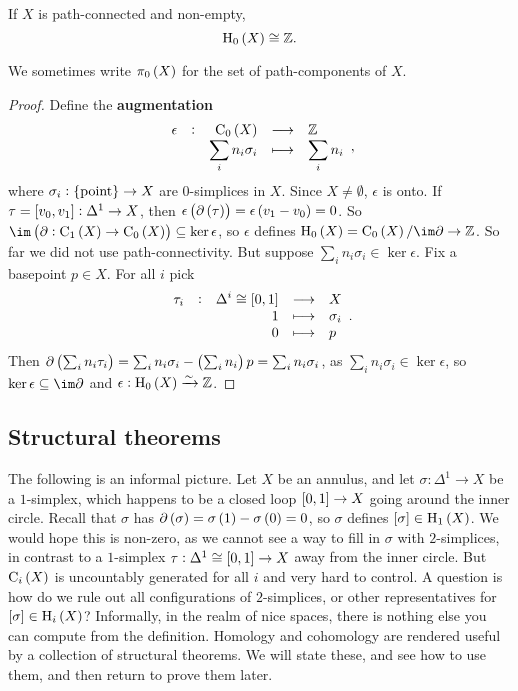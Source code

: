 \begin{lemma}
If $ X $ is path-connected and non-empty,
$$ \H_0\br{X} \cong \ZZ. $$
\end{lemma}

We sometimes write $ \pi_0\br{X} $ for the set of path-components of $ X $.

\begin{proof}
Define the \textbf{augmentation}
$$ \function[\epsilon]{\C_0\br{X}}{\ZZ}{\sum_i n_i\sigma_i}{\sum_i n_i}, $$
where $ \sigma_i : \pt \to X $ are $ 0 $-simplices in $ X $. Since $ X \ne \emptyset $, $ \epsilon $ is onto. If $ \tau = \sbr{v_0, v_1} : \Delta^1 \to X $, then $ \epsilon\br{\da\br{\tau}} = \epsilon\br{v_1 - v_0} = 0 $. So $ \im \br{\da : \C_1\br{X} \to \C_0\br{X}} \subseteq \ker \epsilon $, so $ \epsilon $ defines $ \H_0\br{X} = \C_0\br{X} / \im \da \to \ZZ $. So far we did not use path-connectivity. But suppose $ \sum_i n_i\sigma_i \in \ker \epsilon $. Fix a basepoint $ p \in X $. For all $ i $ pick
$$ \functions[\tau_i]{\Delta^i \cong \sbr{0, 1}}{X}{1}{\sigma_i}{0}{p}. $$
Then $ \da\br{\sum_i n_i\tau_i} = \sum_i n_i\sigma_i - \br{\sum_i n_i}p = \sum_i n_i\sigma_i $, as $ \sum_i n_i\sigma_i \in \ker \epsilon $, so $ \ker \epsilon \subseteq \im \da $ and $ \epsilon : \H_0\br{X} \xrightarrow{\sim} \ZZ $.
\end{proof}

\pagebreak

\subsection{Structural theorems}

The following is an informal picture. Let $ X $ be an annulus, and let $ \sigma : \Delta^1 \to X $ be a $ 1 $-simplex, which happens to be a closed loop $ \sbr{0, 1} \to X $ going around the inner circle. Recall that $ \sigma $ has $ \da\br{\sigma} = \sigma\br{1} - \sigma\br{0} = 0 $, so $ \sigma $ defines $ \sbr{\sigma} \in \H_1\br{X} $. We would hope this is non-zero, as we cannot see a way to fill in $ \sigma $ with $ 2 $-simplices, in contrast to a $ 1 $-simplex $ \tau : \Delta^1 \cong \sbr{0, 1} \to X $ away from the inner circle. But $ \C_i\br{X} $ is uncountably generated for all $ i $ and very hard to control. A question is how do we rule out all configurations of $ 2 $-simplices, or other representatives for $ \sbr{\sigma} \in \H_i\br{X} $? Informally, in the realm of nice spaces, there is nothing else you can compute from the definition. Homology and cohomology are rendered useful by a collection of structural theorems. We will state these, and see how to use them, and then return to prove them later.

